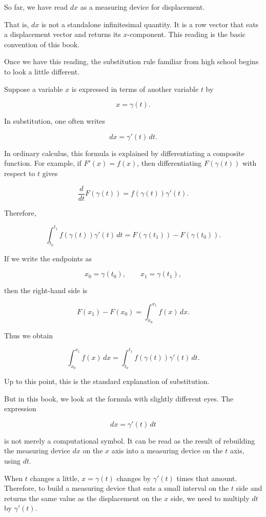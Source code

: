 So far, we have read \(dx\) as a measuring device for displacement.

That is, \(dx\) is not a standalone infinitesimal quantity. It is a row
vector that eats a displacement vector and returns its \(x\)-component.
This reading is the basic convention of this book.

Once we have this reading, the substitution rule familiar from high
school begins to look a little different.

Suppose a variable \(x\) is expressed in terms of another variable \(t\)
by

\[
x=\gamma(t).
\]

In substitution, one often writes

\[
dx=\gamma'(t)\,dt.
\]

In ordinary calculus, this formula is explained by differentiating a
composite function. For example, if \(F'(x)=f(x)\), then differentiating
\(F(\gamma(t))\) with respect to \(t\) gives

\[
\frac{d}{dt}F(\gamma(t))=f(\gamma(t))\gamma'(t).
\]

Therefore,

\[
\int_{t_0}^{t_1}f(\gamma(t))\gamma'(t)\,dt
=F(\gamma(t_1))-F(\gamma(t_0)).
\]

If we write the endpoints as

\[
x_0=\gamma(t_0),\qquad x_1=\gamma(t_1),
\]

then the right-hand side is

\[
F(x_1)-F(x_0)=\int_{x_0}^{x_1}f(x)\,dx.
\]

Thus we obtain

\[
\int_{x_0}^{x_1}f(x)\,dx
=
\int_{t_0}^{t_1}f(\gamma(t))\gamma'(t)\,dt.
\]

Up to this point, this is the standard explanation of substitution.

But in this book, we look at the formula with slightly different eyes.
The expression

\[
dx=\gamma'(t)\,dt
\]

is not merely a computational symbol. It can be read as the result of
rebuilding the measuring device \(dx\) on the \(x\) axis into a
measuring device on the \(t\) axis, using \(dt\).

When \(t\) changes a little, \(x=\gamma(t)\) changes by \(\gamma'(t)\)
times that amount. Therefore, to build a measuring device that eats a
small interval on the \(t\) side and returns the same value as the
displacement on the \(x\) side, we need to multiply \(dt\) by
\(\gamma'(t)\).

